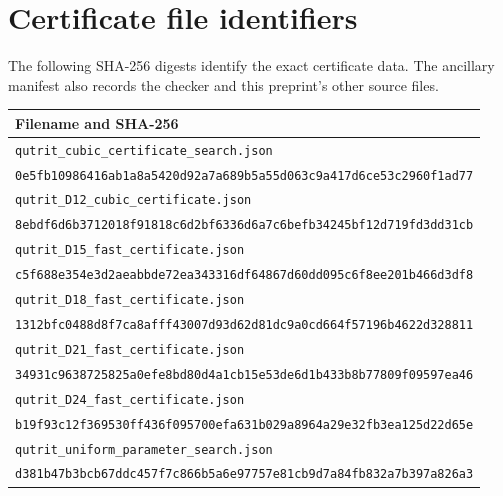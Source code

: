 \documentclass[11pt]{article}
\theoremstyle{remark}\newtheorem{remark}[theorem]{Remark}
\begin{document}
\appendix

\section{Certificate file identifiers}\label{app:data}
The following SHA-256 digests identify the exact certificate data. The ancillary manifest also records the checker and this preprint's other source files.
\begingroup\footnotesize
\begin{longtable}{p{}}
\toprule
\textbf{Filename and SHA-256}\\\midrule
\endhead
\texttt{qutrit\_cubic\_certificate\_search.json}\\
\nolinkurl{0e5fb10986416ab1a8a5420d92a7a689b5a55d063c9a417d6ce53c2960f1ad77}\\[2pt]
\texttt{qutrit\_D12\_cubic\_certificate.json}\\
\nolinkurl{8ebdf6d6b3712018f91818c6d2bf6336d6a7c6befb34245bf12d719fd3dd31cb}\\[2pt]
\texttt{qutrit\_D15\_fast\_certificate.json}\\
\nolinkurl{c5f688e354e3d2aeabbde72ea343316df64867d60dd095c6f8ee201b466d3df8}\\[2pt]
\texttt{qutrit\_D18\_fast\_certificate.json}\\
\nolinkurl{1312bfc0488d8f7ca8afff43007d93d62d81dc9a0cd664f57196b4622d328811}\\[2pt]
\texttt{qutrit\_D21\_fast\_certificate.json}\\
\nolinkurl{34931c9638725825a0efe8bd80d4a1cb15e53de6d1b433b8b77809f09597ea46}\\[2pt]
\texttt{qutrit\_D24\_fast\_certificate.json}\\
\nolinkurl{b19f93c12f369530ff436f095700efa631b029a8964a29e32fb3ea125d22d65e}\\[2pt]
\texttt{qutrit\_uniform\_parameter\_search.json}\\
\nolinkurl{d381b47b3bcb67ddc457f7c866b5a6e97757e81cb9d7a84fb832a7b397a826a3}\\
\bottomrule
\end{longtable}\endgroup
\end{document}

